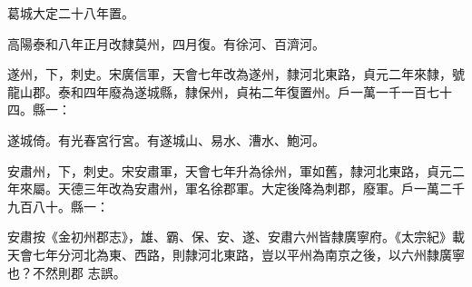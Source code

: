 \begin{pinyinscope}
 葛城大定二十八年置。



 高陽泰和八年正月改隸莫州，四月復。有徐河、百濟河。



 遂州，下，刺史。宋廣信軍，天會七年改為遂州，隸河北東路，貞元二年來隸，號龍山郡。泰和四年廢為遂城縣，隸保州，貞祐二年復置州。戶一萬一千一百七十四。縣一：



 遂城倚。有光春宮行宮。有遂城山、易水、漕水、鮑河。



 安肅州，下，刺史。宋安肅軍，天會七年升為徐州，軍如舊，隸河北東路，貞元二年來屬。天德三年改為安肅州，軍名徐郡軍。大定後降為刺郡，廢軍。戶一萬二千九百八十。縣一：



 安肅按《金初州郡志》，雄、霸、保、安、遂、安肅六州皆隸廣寧府。《太宗紀》載天會七年分河北為東、西路，則隸河北東路，豈以平州為南京之後，以六州隸廣寧也？不然則郡
 志誤。



\end{pinyinscope}